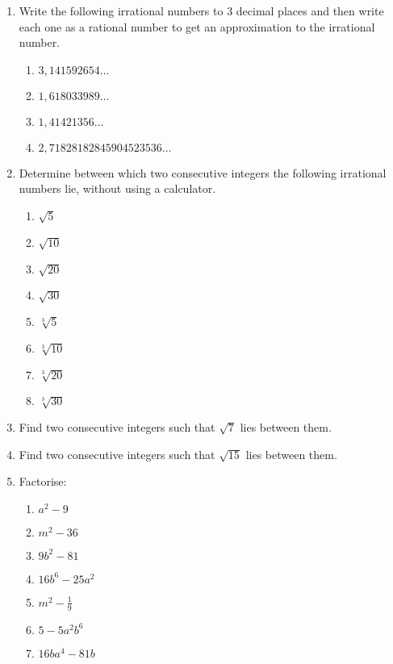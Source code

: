 \begin{eocexercises}{}
\begin{enumerate}[itemsep=5pt, label=\textbf{\arabic*}. ]
\item Write the following irrational numbers to $3$ decimal places and then write each one as a rational number to get an approximation to the irrational number.
\begin{multicols}{2}
\begin{enumerate}[itemsep=5pt, label=\textbf{(\alph*)} ] 
    \item $3,141592654\ldots$
    \item $1,618033989\ldots$
    \item $1,41421356\ldots$
    \item $2,71828182845904523536\ldots$
    \end{enumerate}
\end{multicols}
\item Determine between which two consecutive integers the following irrational numbers lie, without using a calculator.
\begin{multicols}{2}
    \begin{enumerate}[itemsep=5pt, label=\textbf{(\alph*)} ] 
    \item $\sqrt{5}$ 
    \item $\sqrt{10}$ 
    \item $\sqrt{20}$ 
    \item $\sqrt{30}$ 
    \item $\sqrt[3]{5}$ 
    \item $\sqrt[3]{10}$ 
    \item $\sqrt[3]{20}$ 
    \item $\sqrt[3]{30}$ 
    \end{enumerate}
\end{multicols}
\item  Find two consecutive integers such that $\sqrt{7}$ lies between them.          
\item  Find two consecutive integers such that $\sqrt{15}$ lies between them.          
\item Factorise:
\begin{multicols}{2}
\begin{enumerate}[itemsep=5pt, label=\textbf{(\alph*)} ] 
\item ${a}^{2}-9$
\item ${m}^{2}-36$
\item $9{b}^{2}-81$
\item $16{b}^{6}-25{a}^{2}$
\item ${m}^{2}-\frac{1}{9}$
\item $5-5{a}^{2}{b}^{6}$
\item $16b{a}^{4}-81b$

\end{enumerate}
\end{multicols}
\end{enumerate}
\end{eocexercises}
